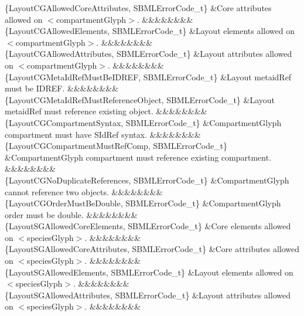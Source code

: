 \begin{DoxyParagraph}{}
\begin{longtabu}
\{Layout\+C\+G\+Allowed\+Core\+Attributes, S\+B\+M\+L\+Error\+Code\+\_\+t\} &Core attributes allowed on {\ttfamily $<$compartment\+Glyph$>$}. &&&&&&&&\\
\{Layout\+C\+G\+Allowed\+Elements, S\+B\+M\+L\+Error\+Code\+\_\+t\} &Layout elements allowed on {\ttfamily $<$compartment\+Glyph$>$}. &&&&&&&&\\
\{Layout\+C\+G\+Allowed\+Attributes, S\+B\+M\+L\+Error\+Code\+\_\+t\} &Layout attributes allowed on {\ttfamily $<$compartment\+Glyph$>$}. &&&&&&&&\\
\{Layout\+C\+G\+Meta\+Id\+Ref\+Must\+Be\+I\+D\+R\+EF, S\+B\+M\+L\+Error\+Code\+\_\+t\} &Layout \textquotesingle{}metaid\+Ref\textquotesingle{} must be I\+D\+R\+EF. &&&&&&&&\\
\{Layout\+C\+G\+Meta\+Id\+Ref\+Must\+Reference\+Object, S\+B\+M\+L\+Error\+Code\+\_\+t\} &Layout \textquotesingle{}metaid\+Ref\textquotesingle{} must reference existing object. &&&&&&&&\\
\{Layout\+C\+G\+Compartment\+Syntax, S\+B\+M\+L\+Error\+Code\+\_\+t\} &Compartment\+Glyph \textquotesingle{}compartment\textquotesingle{} must have S\+Id\+Ref syntax. &&&&&&&&\\
\{Layout\+C\+G\+Compartment\+Must\+Ref\+Comp, S\+B\+M\+L\+Error\+Code\+\_\+t\} &Compartment\+Glyph compartment must reference existing compartment. &&&&&&&&\\
\{Layout\+C\+G\+No\+Duplicate\+References, S\+B\+M\+L\+Error\+Code\+\_\+t\} &Compartment\+Glyph cannot reference two objects. &&&&&&&&\\
\{Layout\+C\+G\+Order\+Must\+Be\+Double, S\+B\+M\+L\+Error\+Code\+\_\+t\} &Compartment\+Glyph order must be double. &&&&&&&&\\
\{Layout\+S\+G\+Allowed\+Core\+Elements, S\+B\+M\+L\+Error\+Code\+\_\+t\} &Core elements allowed on {\ttfamily $<$species\+Glyph$>$}. &&&&&&&&\\
\{Layout\+S\+G\+Allowed\+Core\+Attributes, S\+B\+M\+L\+Error\+Code\+\_\+t\} &Core attributes allowed on {\ttfamily $<$species\+Glyph$>$}. &&&&&&&&\\
\{Layout\+S\+G\+Allowed\+Elements, S\+B\+M\+L\+Error\+Code\+\_\+t\} &Layout elements allowed on {\ttfamily $<$species\+Glyph$>$}. &&&&&&&&\\
\{Layout\+S\+G\+Allowed\+Attributes, S\+B\+M\+L\+Error\+Code\+\_\+t\} &Layout attributes allowed on {\ttfamily $<$species\+Glyph$>$}. &&&&&&&&\\

\end{longtabu}
\end{DoxyParagraph}
